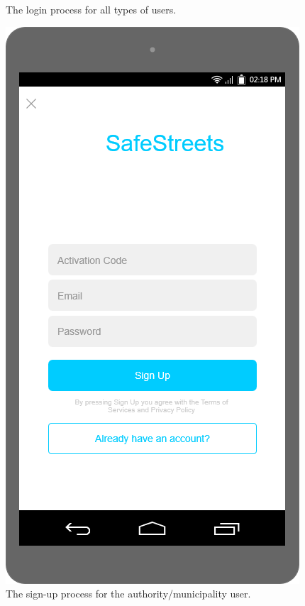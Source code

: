\documentclass[./main.tex]{subfiles}
\begin{document}
\begin{figure}[h]
\begin{minipage}[t]{\mockupdimension}
        \caption{The login process for all types of users.}
        \label{fig:login}
    \end{minipage}
    \hfill
    \begin{minipage}[t]{\mockupdimension}
        \includegraphics[width=\textwidth]{resources/Mockups/sign_up}
        \caption{The sign-up process for the authority/municipality user.}
        \label{fig:signup}
    \end{minipage}
\end{figure}
\vfill
\end{document}
